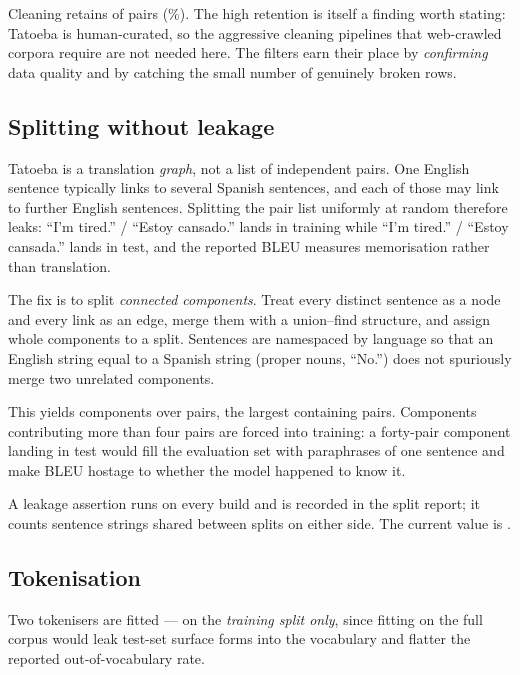 \documentclass[11pt,a4paper]{article}
\begin{document}
Cleaning retains \PairsClean{} of \PairsRaw{} pairs (\RetentionPercent\%). The
high retention is itself a finding worth stating: Tatoeba is human-curated, so
the aggressive cleaning pipelines that web-crawled corpora require are not
needed here. The filters earn their place by \emph{confirming} data quality and
by catching the small number of genuinely broken rows.

\subsection{Splitting without leakage}
\label{sec:splitting}

\begin{keypoint}
Tatoeba is a translation \emph{graph}, not a list of independent pairs. One
English sentence typically links to several Spanish sentences, and each of
those may link to further English sentences. Splitting the pair list uniformly
at random therefore leaks: ``I'm tired.'' / ``Estoy cansado.'' lands in
training while ``I'm tired.'' / ``Estoy cansada.'' lands in test, and the
reported BLEU measures memorisation rather than translation.
\end{keypoint}

The fix is to split \emph{connected components}. Treat every distinct sentence
as a node and every link as an edge, merge them with a union--find structure,
and assign whole components to a split. Sentences are namespaced by language so
that an English string equal to a Spanish string (proper nouns, ``No.'') does
not spuriously merge two unrelated components.

This yields \Components{} components over \PairsClean{} pairs, the largest
containing \LargestComponent{} pairs. Components contributing more than four
pairs are forced into training: a forty-pair component landing in test would
fill the evaluation set with paraphrases of one sentence and make BLEU hostage
to whether the model happened to know it.

A leakage assertion runs on every build and is recorded in the split report; it
counts sentence strings shared between splits on either side. The current value
is \textbf{\Leakage}.

\subsection{Tokenisation}

Two tokenisers are fitted --- on the \emph{training split only}, since fitting
on the full corpus would leak test-set surface forms into the vocabulary and
flatter the reported out-of-vocabulary rate.
\end{document}
